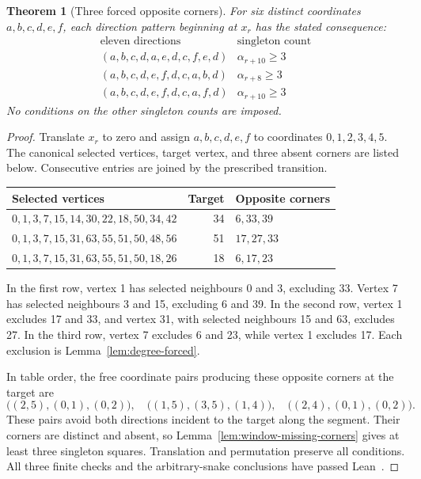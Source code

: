 \documentclass[11pt,a4paper]{article}
\newtheorem{theorem}{Theorem}[section]
\theoremstyle{definition}
\theoremstyle{remark}
\begin{document}
\begin{theorem}[Three forced opposite corners]\label{thm:three-forced-corners}
For six distinct coordinates $a,b,c,d,e,f$, each direction pattern beginning at $x_r$ has the stated consequence:
\[
\begin{array}{c|c}
\text{eleven directions}&\text{singleton count}\\\hline
(a,b,c,d,a,e,d,c,f,e,d)&\alpha_{r+10}\ge3\\
(a,b,c,d,e,f,d,c,a,b,d)&\alpha_{r+8}\ge3\\
(a,b,c,d,e,f,d,c,a,f,d)&\alpha_{r+10}\ge3
\end{array}
\]
No conditions on the other singleton counts are imposed.
\end{theorem}
\begin{proof}
Translate $x_r$ to zero and assign $a,b,c,d,e,f$ to coordinates $0,1,2,3,4,5$. The canonical selected vertices, target vertex, and three absent corners are listed below. Consecutive entries are joined by the prescribed transition.
\begin{center}\small
\begin{tabular}{p{}r l}
\toprule
Selected vertices & Target & Opposite corners\\\midrule
$0,1,3,7,15,14,30,22,18,50,34,42$ & 34 & $6,33,39$\\
$0,1,3,7,15,31,63,55,51,50,48,56$ & 51 & $17,27,33$\\
$0,1,3,7,15,31,63,55,51,50,18,26$ & 18 & $6,17,23$\\
\bottomrule
\end{tabular}
\end{center}
In the first row, vertex 1 has selected neighbours 0 and 3, excluding 33. Vertex 7 has selected neighbours 3 and 15, excluding 6 and 39. In the second row, vertex 1 excludes 17 and 33, and vertex 31, with selected neighbours 15 and 63, excludes 27. In the third row, vertex 7 excludes 6 and 23, while vertex 1 excludes 17. Each exclusion is Lemma~\ref{lem:degree-forced}.

In table order, the free coordinate pairs producing these opposite corners at the target are
\[
\bigl((2,5),(0,1),(0,2)\bigr),\quad
\bigl((1,5),(3,5),(1,4)\bigr),\quad
\bigl((2,4),(0,1),(0,2)\bigr).
\]
These pairs avoid both directions incident to the target along the segment. Their corners are distinct and absent, so Lemma~\ref{lem:window-missing-corners} gives at least three singleton squares. Translation and permutation preserve all conditions. All three finite checks and the arbitrary-snake conclusions have passed Lean~\cite{choicearchive,newmodelarchive}.
\end{proof}
\end{document}
